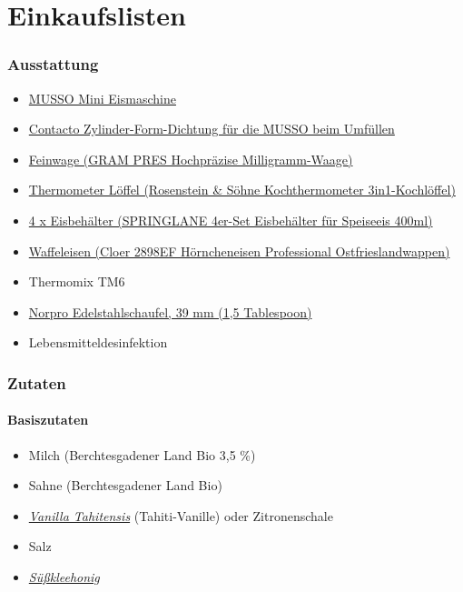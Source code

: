 \documentclass[12pt]{article}
\begin{document}
\pagebreak

\tableofcontents

\clearpage
\newpage


\part {Einkaufslisten}
\section{Ausstattung}


\begin{itemize}
 	\item \href{https://amzn.to/43WvDjI}{MUSSO Mini Eismaschine}
 	\item \href{https://amzn.to/3U14BmH}{Contacto Zylinder-Form-Dichtung für die MUSSO beim Umfüllen}
	\item \href{https://amzn.to/3w2hKUm}{Feinwage (GRAM PRES Hochpräzise Milligramm-Waage)}	
	\item \href{https://amzn.to/3vR03XR}{Thermometer Löffel (Rosenstein \& Söhne Kochthermometer 3in1-Kochlöffel)}
	\item \href{https://amzn.to/4aTZBH4}{4 x Eisbehälter (SPRINGLANE 4er-Set Eisbehälter für Speiseeis 400ml)}
	\item \href{https://amzn.to/3UiqkIe} {Waffeleisen (Cloer 2898EF Hörncheneisen Professional Ostfrieslandwappen)}
	\item Thermomix TM6
	\item \href{https://amzn.to/3PZtSME}{Norpro Edelstahlschaufel, 39 mm (1,5 Tablespoon)}
	\item Lebensmitteldesinfektion	
\end{itemize}

\newpage
\section{Zutaten}
\subsection{Basiszutaten}
\begin{itemize}
  \item Milch (Berchtesgadener Land Bio 3,5 \%)
  \item Sahne (Berchtesgadener Land Bio)
  \item \href{https://faszination-vanille.de/product/stange-tahiti-vanille/}{\textit{Vanilla Tahitensis}}  (Tahiti-Vanille) oder Zitronenschale
  \item Salz
  \item \href{https://www.feldt-honig.de/bio-honig-500g-glas/61/bio-suessklee-500-g-sardinien/de-oeko-006}{\textit{Süßkleehonig}}
\end{itemize}
\end{document}
